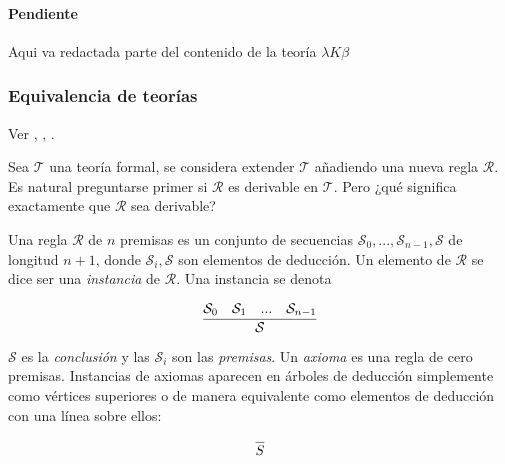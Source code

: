 \paragraph{Pendiente} Aqui va redactada parte del contenido de la teoría \( λKβ \)

\subsubsection{Equivalencia de teorías}
\label{sec:equivalenciateorias}

Ver \cite{HindleySeldin:LambdaCalculusAndCombinators}, \cite{Troelstra:ProofTheory}, \cite{Mendelson:Logic}.

Sea \( \mathcal{T} \) una teoría formal, se considera extender \( \mathcal{T} \) añadiendo una nueva regla \( \mathcal{R} \). Es natural preguntarse primer si \( \mathcal{R} \) es derivable en \( \mathcal{T} \). Pero ¿qué significa exactamente que \( \mathcal{R} \) sea derivable?

\begin{defn}[Regla]
  \label{defn:regla}
  Una regla \( \mathcal{R} \) de \( n \) premisas es un conjunto de secuencias \( \mathcal{S}_{0},...,\mathcal{S}_{n-1},\mathcal{S} \) de longitud \( n+1 \), donde \( \mathcal{S}_{i},\mathcal{S} \) son elementos de deducción. Un elemento de \( \mathcal{R} \) se dice ser una \emph{instancia} de \( \mathcal{R} \). Una instancia se denota

  \[ \infer{\mathcal{S}}{\mathcal{S}_{0} & \mathcal{S}_{1} & ... & \mathcal{S}_{n-1}} \]

  \( \mathcal{S} \) es la \emph{conclusión} y las \( \mathcal{S}_{i} \) son las \emph{premisas}. Un \emph{axioma} es una regla de cero premisas. Instancias de axiomas aparecen en árboles de deducción simplemente como vértices superiores o de manera equivalente como elementos de deducción con una línea sobre ellos:

  \[ \infer{S}{} \]
\end{defn}

